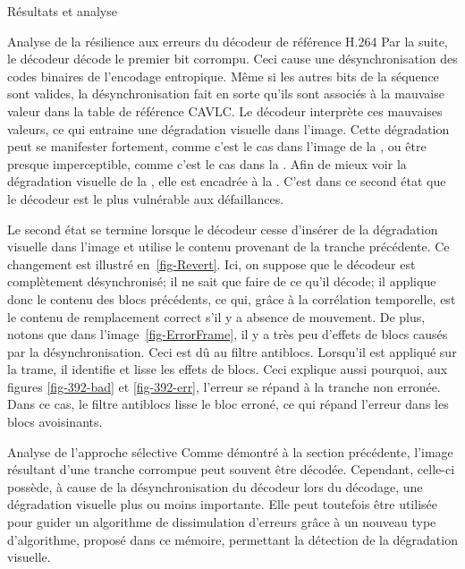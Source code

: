 \begin{chapter}{Résultats et analyse}
\begin{section}{Analyse de la résilience aux erreurs du décodeur de référence H.264}
Par la suite, le décodeur décode le premier bit corrompu. Ceci cause une
désynchronisation des codes binaires de l'encodage entropique. Même si les
autres bits de la séquence sont valides, la désynchronisation fait en sorte
qu'ils sont associés à la mauvaise valeur dans la table de référence CAVLC. Le
décodeur interprète ces mauvaises valeurs, ce qui entraine une dégradation
visuelle dans l'image. Cette dégradation peut se manifester fortement, comme
c'est le cas dans l'image de la , ou être presque
imperceptible, comme c'est le cas dans la . Afin de mieux
voir la dégradation visuelle de la , elle est encadrée à la
. C'est dans ce second état que le décodeur est le plus
vulnérable aux défaillances.

Le second état se termine lorsque le décodeur cesse d'insérer de la dégradation
visuelle dans l'image et utilise le contenu provenant de la tranche précédente.
Ce changement est illustré en~\ref{fig-Revert}. Ici, on suppose que le décodeur
est complètement désynchronisé; il ne sait que faire de ce qu'il décode; il
applique donc le contenu des blocs précédents, ce qui, grâce à la corrélation
temporelle, est le contenu de remplacement correct s'il y a absence de
mouvement. De plus, notons que dans l'image~\ref{fig-ErrorFrame}, il y a très
peu d'effets de blocs causés par la désynchronisation. Ceci est dû au filtre
antiblocs. Lorsqu'il est appliqué sur la trame, il identifie et lisse les
effets de blocs. Ceci explique aussi pourquoi, aux figures \ref{fig-392-bad} et
\ref{fig-392-err}, l'erreur se répand à la tranche non erronée. Dans ce cas, le
filtre antiblocs lisse le bloc erroné, ce qui répand l'erreur dans les blocs
avoisinants.

\FloatBarrier
\end{section}

\begin{section}{Analyse de l'approche sélective}
\label{sec-ApprocheSelective}
Comme démontré à la section précédente, l'image résultant d'une tranche
corrompue peut souvent être décodée. Cependant, celle-ci possède, à cause de la
désynchronisation du décodeur lors du décodage, une dégradation visuelle plus ou
moins importante. Elle peut toutefois être utilisée pour guider un algorithme de
dissimulation d'erreurs grâce à un nouveau type d'algorithme, proposé dans ce
mémoire, permettant la détection de la dégradation visuelle.


\end{section}
\end{chapter}
